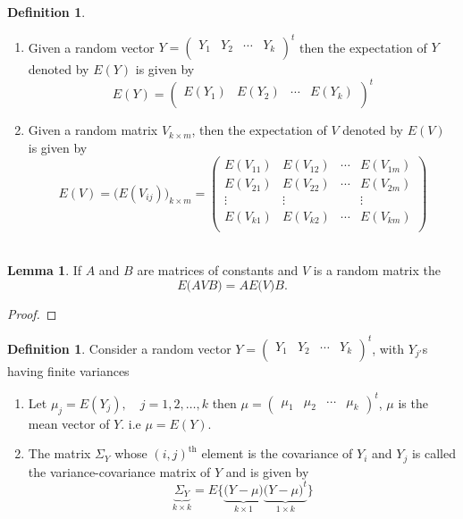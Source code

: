 \documentclass[11pt,a4paper]{article}
\theoremstyle{definition}
\newtheorem{defn}[thm]{Definition}
\newtheorem{lem}[thm]{Lemma}
\begin{document}
\begin{defn}\label{res:defn:1.2.2}
\begin{enumerate}
\item[i.] Given a random vector $Y=
\begin{pmatrix}
Y_1 & Y_2 & \cdots & Y_k\\
\end{pmatrix}^t
$ then the expectation of $Y$ denoted by $E(Y)$ is given by $$E(Y)=
\begin{pmatrix}
E(Y_1) & E(Y_2) & \cdots & E(Y_k)\\
\end{pmatrix}^t
$$
\item[ii.] Given a random matrix $V_{k\times m}$, then the expectation of $V$ denoted by $E(V)$ is given by
$$ E(V)=\Big(E(V_{ij})\Big)_{k\times m}=
\begin{pmatrix}
E(V_{11}) & E(V_{12}) & \cdots  & E(V_{1m})\\
E(V_{21}) & E(V_{22}) & \cdots  & E(V_{2m})\\
\vdots    & \vdots    &         & \vdots \\
E(V_{k1}) & E(V_{k2}) & \cdots  & E(V_{km})\\ 
\end{pmatrix}
$$\\
\end{enumerate}
\end{defn}


\begin{lem}\label{res:lem:1.2.3}
If $A$ and $B$ are matrices of constants and $V$ is a random matrix the $$E\big(AVB\big)=AE\big(V\big)B.$$
\end{lem}


\begin{proof}

\end{proof}


\begin{defn}\label{res:defn:1.2.4}
Consider a random vector $Y=
\begin{pmatrix}
Y_1 & Y_2 & \cdots & Y_k\\
\end{pmatrix}^t
$, with $Y_{j'}$s having finite variances
\begin{enumerate}
\item[i.] Let $\mu_j=E(Y_j),\quad  j=1,2,\ldots ,k$ then $
\mu=
\begin{pmatrix}
\mu_1 & \mu_2 & \cdots & \mu_k
\end{pmatrix}^t
$, $\mu$ is the mean vector of $Y$. i.e $\mu=E(Y)$.
\item[ii.] The matrix $\Sigma_Y$ whose $(i,j)^{\text{th}}$ element is the covariance of $Y_i$ and $Y_j$ is called the variance-covariance matrix of $Y$ and is given by $$\underbrace{\Sigma_Y}_{k\times k} = E\Big\{\underbrace{\big(Y-\mu\big)}_{k\times 1}\underbrace{\big(Y-\mu\big)^t}_{1\times k}\Big\}$$\\
\end{enumerate}
\end{defn}
\end{document}
